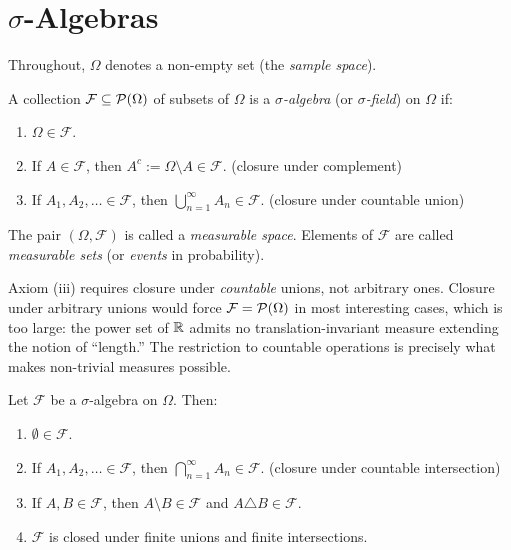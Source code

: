 \documentclass[11pt,a4paper]{article}
\begin{document}

\section{$\sigma$-Algebras}
\label{sec:sigma_algebras}

Throughout, $\Omega$ denotes a non-empty set (the \emph{sample space}).

\begin{definition}
\label{def:sigma_algebra}
A collection $\mathcal{F} \subseteq \mathcal{P}(\Omega)$ of subsets of
$\Omega$ is a \emph{$\sigma$-algebra} (or \emph{$\sigma$-field}) on
$\Omega$ if:
\begin{enumerate}[nosep,label=(\roman*)]
  \item $\Omega \in \mathcal{F}$.
  \item If $A \in \mathcal{F}$, then $A^c := \Omega \setminus A \in
    \mathcal{F}$.
    \hfill(closure under complement)
  \item If $A_1, A_2, \ldots \in \mathcal{F}$, then
    $\bigcup_{n=1}^\infty A_n \in \mathcal{F}$.
    \hfill(closure under countable union)
\end{enumerate}
The pair $(\Omega, \mathcal{F})$ is called a \emph{measurable space}.
Elements of $\mathcal{F}$ are called \emph{measurable sets} (or
\emph{events} in probability).
\end{definition}

\begin{remark}
\label{rem:countable}
Axiom (iii) requires closure under \emph{countable} unions, not arbitrary
ones. Closure under arbitrary unions would force
$\mathcal{F} = \mathcal{P}(\Omega)$ in most interesting cases, which is too
large: the power set of $\mathbb{R}$ admits no translation-invariant measure
extending the notion of ``length.'' The restriction to countable
operations is precisely what makes non-trivial measures possible.
\end{remark}

\begin{proposition}
\label{prop:sigma_basic}
Let $\mathcal{F}$ be a $\sigma$-algebra on $\Omega$. Then:
\begin{enumerate}[nosep,label=(\alph*)]
  \item $\emptyset \in \mathcal{F}$.
  \item If $A_1, A_2, \ldots \in \mathcal{F}$, then
    $\bigcap_{n=1}^\infty A_n \in \mathcal{F}$.
    \hfill(closure under countable intersection)
  \item If $A, B \in \mathcal{F}$, then $A \setminus B \in \mathcal{F}$
    and $A \triangle B \in \mathcal{F}$.
  \item $\mathcal{F}$ is closed under finite unions and finite intersections.
\end{enumerate}
\end{proposition}
\end{document}
